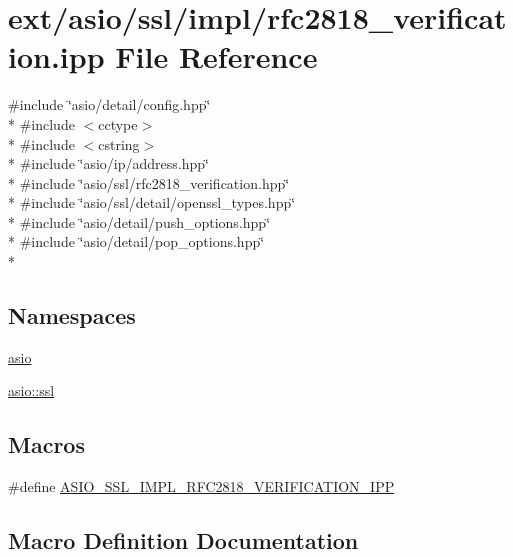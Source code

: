 \hypertarget{rfc2818__verification_8ipp}{}\section{ext/asio/ssl/impl/rfc2818\+\_\+verification.ipp File Reference}
\label{rfc2818__verification_8ipp}
{\ttfamily \#include \char`\"{}asio/detail/config.\+hpp\char`\"{}}\\*
{\ttfamily \#include $<$cctype$>$}\\*
{\ttfamily \#include $<$cstring$>$}\\*
{\ttfamily \#include \char`\"{}asio/ip/address.\+hpp\char`\"{}}\\*
{\ttfamily \#include \char`\"{}asio/ssl/rfc2818\+\_\+verification.\+hpp\char`\"{}}\\*
{\ttfamily \#include \char`\"{}asio/ssl/detail/openssl\+\_\+types.\+hpp\char`\"{}}\\*
{\ttfamily \#include \char`\"{}asio/detail/push\+\_\+options.\+hpp\char`\"{}}\\*
{\ttfamily \#include \char`\"{}asio/detail/pop\+\_\+options.\+hpp\char`\"{}}\\*
\subsection*{Namespaces}
\begin{DoxyCompactItemize}
\item 
 \hyperlink{namespaceasio}{asio}
\item 
 \hyperlink{namespaceasio_1_1ssl}{asio\+::ssl}
\end{DoxyCompactItemize}
\subsection*{Macros}
\begin{DoxyCompactItemize}
\item 
\#define \hyperlink{rfc2818__verification_8ipp_addbf67b60d8d732ad04209951b03c0f3}{A\+S\+I\+O\+\_\+\+S\+S\+L\+\_\+\+I\+M\+P\+L\+\_\+\+R\+F\+C2818\+\_\+\+V\+E\+R\+I\+F\+I\+C\+A\+T\+I\+O\+N\+\_\+\+I\+P\+P}
\end{DoxyCompactItemize}


\subsection{Macro Definition Documentation}
\hypertarget{rfc2818__verification_8ipp_addbf67b60d8d732ad04209951b03c0f3}{}
